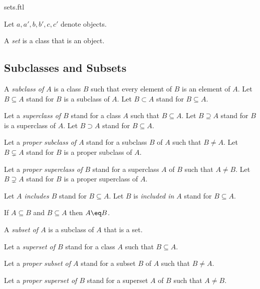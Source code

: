 \documentclass{article}
\begin{document}
\begin{smodule}{sets.ftl}
\begin{forthel}
  Let $a,a',b,b',c,c'$ denote objects.
\end{forthel}

\begin{definition*}
  A \emph{set} is a class that is an object.
\end{definition*}


\subsection{Subclasses and Subsets}

\begin{definition*}[forthel,id=SubclassDef,printid]
  A \emph{subclass of $A$} is a class $B$ such that every element of $B$ is an element of $A$.
  Let $B\subseteq A$ stand for $B$ is a subclass of $A$.
  Let $B\subset A$ stand for $B\subseteq A$.

  Let a \emph{superclass of $B$} stand for a class $A$ such that $B\subseteq A$.
  Let $B\supseteq A$ stand for $B$ is a superclass of $A$.
  Let $B\supset A$ stand for $B\subseteq A$.

  Let a \emph{proper subclass of $A$} stand for a subclass $B$ of $A$ such that $B\neq A$.
  Let $B\subsetneq A$ stand for $B$ is a proper subclass of $A$.

  Let a \emph{proper superclass of $B$} stand for a superclass $A$ of $B$ such that $A \neq B$.
  Let $B\supsetneq A$ stand for $B$ is a proper superclass of $A$.

  Let \emph{$A$ includes $B$} stand for $B\subseteq A$.
  Let $B$ is \emph{included in $A$} stand for $B\subseteq A$.
\end{definition*}

\begin{axiom*}[forthel,title=Class Extensionality Axiom,id=ClassExtensionalityAx,printid]
  If $A\subseteq B$ and $B\subseteq A$ then $A\eq B$.
\end{axiom*}

\begin{definition*}[forthel,id=SubsetDef,printid]
  A \emph{subset of $A$} is a subclass of $A$ that is a set.

  Let a \emph{superset of $B$} stand for a class $A$ such that $B\subseteq A$.

  Let a \emph{proper subset of $A$} stand for a subset $B$ of $A$ such that $B\neq A$.

  Let a \emph{proper superset of $B$} stand for a superset $A$ of $B$ such that $A \neq B$.
\end{definition*}


\end{smodule}
\end{document}
